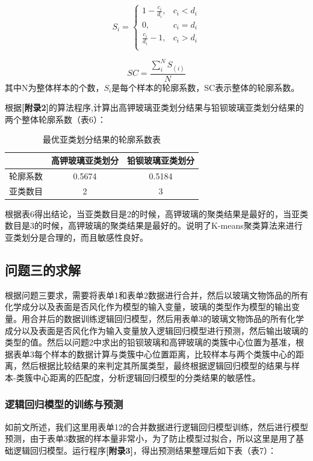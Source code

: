 \documentclass[withoutpreface,bwprint]{cumcmthesis}%
\begin{document}
	\begin{equation}
		S_{i} =
		\begin{cases}
			1-\frac{c_{i}}{d_{i}},       & c_{i} < d_{i}\\
			0,   & c_{i} = d_{i}\\
			\frac{c_{i}}{d_{i} }- 1 ,      & c_{i} > d_{i}\\
		\end{cases}
	\end{equation}
	
	\begin{equation}
		SC = \frac{\sum_{i}^{N} S_(i)}{N}
	\end{equation}
	其中N为整体样本的个数，$S_{i}$是每个样本的轮廓系数，SC表示整体的轮廓系数。
	
	根据\textbf{[附录2]}的算法程序,计算出高钾玻璃亚类划分结果与铅钡玻璃亚类划分结果的两个整体轮廓系数（表6）：
	
	\begin{table}[!htb]
		\centering
		\caption{最优亚类划分结果的轮廓系数表}
		\begin{tabular}{ccc}
			\toprule[1.5pt]
			 & 高钾玻璃亚类划分&铅钡玻璃亚类划分\\
			\midrule[1pt]
			轮廓系数&0.5674&0.5184\\
			\hline
			亚类数目&2&3\\
			\bottomrule[1.5pt]
		\end{tabular}
	\end{table}
	
	根据表6得出结论，当亚类数目是2的时候，高钾玻璃的聚类结果是最好的，当亚类数目是3的时候，高钾玻璃的聚类结果是最好的。说明了K-means聚类算法来进行亚类划分是合理的，而且敏感性良好。
	
	\subsection{问题三的求解}
	根据问题三要求，需要将表单1和表单2数据进行合并，然后以玻璃文物饰品的所有化学成分以及表面是否风化作为模型的输入变量，玻璃的类型作为模型的输出变量。用合并后的数据训练逻辑回归模型，然后用表单3的玻璃文物饰品的所有化学成分以及表面是否风化作为输入变量放入逻辑回归模型进行预测，然后输出玻璃的类型的值。然后以问题2中求出的铅钡玻璃和高钾玻璃的类簇中心位置为基准，根据表单3每个样本的数据计算与类簇中心位置距离，比较样本与两个类簇中心的距离，然后根据比较结果的来判定其所属类型，最终根据逻辑回归模型的结果与样本-类簇中心距离的匹配度，分析逻辑回归模型的分类结果的敏感性。
	
	\subsubsection{逻辑回归模型的训练与预测}
	如前文所述，我们这里用表单12的合并数据进行逻辑回归模型训练，然后进行模型预测，由于表单3数据的样本量非常小，为了防止模型过拟合，所以这里是用了基础逻辑回归模型。运行程序\textbf{[附录3]}，得出预测结果整理后如下表（表7）：
	
\end{document}
